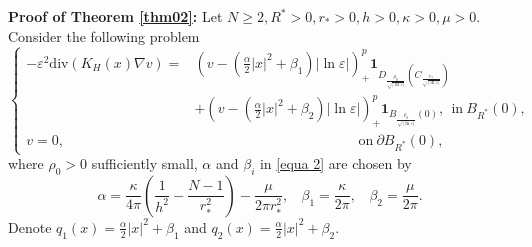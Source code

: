 \documentclass[12pt,reqno]{amsart}
\numberwithin{equation}{section}
\theoremstyle{definition}
\theoremstyle{remark}
\begin{document}
\textbf{Proof of Theorem \ref{thm02}:}
 Let $ N\geq 2, R^*>0, r_*>0, h>0, \kappa>0, \mu>0 $. Consider  the following problem
\begin{equation}\label{equa 2}
\begin{cases}
-\varepsilon^2\text{div}(K_H(x)\nabla v)=&\left (v-\left(\frac{\alpha}{2}|x|^2+\beta_1 \right)|\ln\varepsilon| \right )^{p}_+\textbf{1}_{D_{\frac{\rho_0}{\sqrt{|\ln\varepsilon|}}}\left (C_{\frac{r_*}{\sqrt{|\ln\varepsilon|}}}\right )}\\
&+\left (v-\left(\frac{\alpha}{2}|x|^2+\beta_2 \right)|\ln\varepsilon| \right )^{p}_+\textbf{1}_{B_{\frac{\rho_0}{\sqrt{|\ln\varepsilon|}}}\left (0\right )},\ \ \text{in}\  B_{R^*}(0),\\
v=0,&\ \ \ \ \ \ \ \ \ \ \ \ \ \ \ \ \ \ \ \ \ \ \ \ \ \ \ \ \ \ \ \ \ \ \ \ \ \ \ \ \ \ \ \ \ \ \ \ \ \ \ \ \ \text{on}\ \partial B_{R^*}(0),
\end{cases}
\end{equation}
where  $ \rho_0>0 $ sufficiently small, %
 $ \alpha $ and $ \beta_i $ in \eqref{equa 2} are chosen by
\begin{equation*}
\alpha=\frac{\kappa}{4\pi}\left( \frac{1}{h^2}-\frac{N-1}{r_*^2}\right)-\frac{\mu}{2\pi r_*^2},\ \ \ \ \beta_1=\frac{\kappa}{2\pi}, \ \ \ \ \beta_2=\frac{\mu}{2\pi}.
\end{equation*}
Denote $ q_1(x)=\frac{\alpha}{2}|x|^2+\beta_1 $ and $ q_2(x)=\frac{\alpha}{2}|x|^2+\beta_2. $
\end{document}
